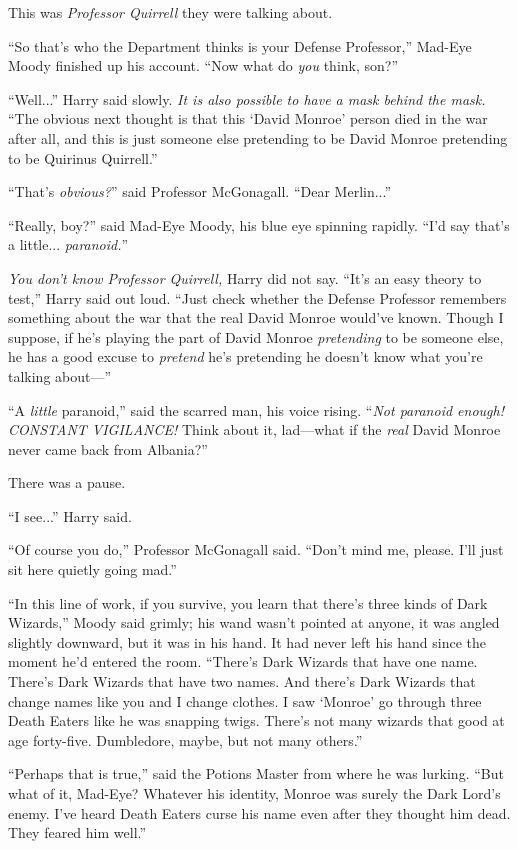 This was \emph{Professor Quirrell} they were talking about.

“So that’s who the Department thinks is your Defense Professor,” Mad-Eye Moody finished up his account. “Now what do \emph{you} think, son?”

“Well...” Harry said slowly. \emph{It is also possible to have a mask behind the mask.} “The obvious next thought is that this ‘David Monroe’ person died in the war after all, and this is just someone else pretending to be David Monroe pretending to be Quirinus Quirrell.”

“That’s \emph{obvious?}” said Professor McGonagall. “Dear Merlin...”

“Really, boy?” said Mad-Eye Moody, his blue eye spinning rapidly. “I’d say that’s a little... \emph{paranoid.}”

\emph{You don’t know Professor Quirrell,} Harry did not say. “It’s an easy theory to test,” Harry said out loud. “Just check whether the Defense Professor remembers something about the war that the real David Monroe would’ve known. Though I suppose, if he’s playing the part of David Monroe \emph{pretending} to be someone else, he has a good excuse to \emph{pretend} he’s pretending he doesn’t know what you’re talking about—”

“A \emph{little} paranoid,” said the scarred man, his voice rising. “\emph{Not paranoid enough! CONSTANT VIGILANCE!} Think about it, lad—what if the \emph{real} David Monroe never came back from Albania?”

There was a pause.

“I see...” Harry said.

“Of course you do,” Professor McGonagall said. “Don’t mind me, please. I’ll just sit here quietly going mad.”

“In this line of work, if you survive, you learn that there’s three kinds of Dark Wizards,” Moody said grimly; his wand wasn’t pointed at anyone, it was angled slightly downward, but it was in his hand. It had never left his hand since the moment he’d entered the room. “There’s Dark Wizards that have one name. There’s Dark Wizards that have two names. And there’s Dark Wizards that change names like you and I change clothes. I saw ‘Monroe’ go through three Death Eaters like he was snapping twigs. There’s not many wizards that good at age forty-five. Dumbledore, maybe, but not many others.”

“Perhaps that is true,” said the Potions Master from where he was lurking. “But what of it, Mad-Eye? Whatever his identity, Monroe was surely the Dark Lord’s enemy. I’ve heard Death Eaters curse his name even after they thought him dead. They feared him well.”

